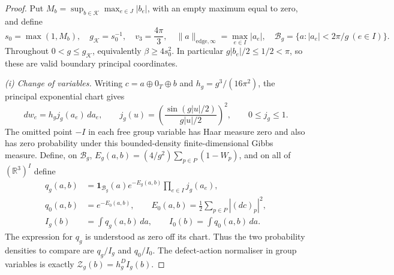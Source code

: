 \documentclass[11pt,a4paper]{article}
\theoremstyle{plain}
\theoremstyle{definition}
\theoremstyle{remark}
\numberwithin{equation}{section}
\newcommand{\R}{\mathbb{R}}
\begin{document}
\begin{proof}
Put $M_b=\sup_{b\in\mathcal K}\max_{e\in J}|b_e|$, with an empty maximum equal to zero, and define
\[
s_0=\max(1,M_b),\quad g_{\mathcal K}=s_0^{-1},\quad v_3=\frac{4\pi}{3},\quad
\|a\|_{\mathrm{edge},\infty}=\max_{e\in I}|a_e|,\quad
\mathcal B_g=\{a:|a_e|<2\pi/g\ (e\in I)\}.
\]
Throughout $0<g\le g_{\mathcal K}$, equivalently $\beta\ge4s_0^2$.
In particular $g|b_e|/2\le1/2<\pi$, so these are valid boundary principal coordinates.

\emph{(i) Change of variables.}
Writing $c=a\oplus0_T\oplus b$ and $h_g=g^3/(16\pi^2)$, the principal exponential chart gives
\[
dw_e=h_g j_g(a_e)\,da_e,\qquad
j_g(u)=\left(\frac{\sin(g|u|/2)}{g|u|/2}\right)^2,
\qquad 0\le j_g\le1.
\]
The omitted point $-I$ in each free group variable has Haar measure zero and also has zero probability under this bounded-density
finite-dimensional Gibbs measure. Define, on $\mathcal B_g$,
$E_g(a,b)=(4/g^2)\sum_{p\in P}(1-W_p)$, and on all of $(\R^3)^I$ define
\begin{equation*}\tag{S.1}\label{eq:S-density}
\begin{aligned}
q_g(a,b)&=\mathbf1_{\mathcal B_g}(a)e^{-E_g(a,b)}\prod_{e\in I}j_g(a_e),\\
q_0(a,b)&=e^{-E_0(a,b)},\qquad E_0(a,b)=\frac12\sum_{p\in P}|(dc)_p|^2,\\
I_g(b)&=\int q_g(a,b)\,da,\qquad I_0(b)=\int q_0(a,b)\,da.
\end{aligned}
\end{equation*}
The expression for $q_g$ is understood as zero off its chart. Thus the two probability densities to compare are $q_g/I_g$ and
$q_0/I_0$. The defect-action normaliser in group variables is exactly $\mathcal Z_g(b)=h_g^D I_g(b)$.


\end{proof}
\end{document}

